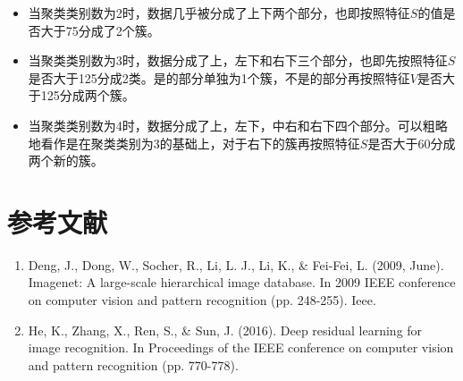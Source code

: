 \documentclass[UTF8]{ctexart}
\begin{document}
	\begin{itemize}
		\item 当聚类类别数为2时，数据几乎被分成了上下两个部分，也即按照特征$S$的值是否大于75分成了2个簇。
		\item 当聚类类别数为3时，数据分成了上，左下和右下三个部分，也即先按照特征$S$是否大于125分成2类。是的部分单独为1个簇，不是的部分再按照特征$V$是否大于125分成两个簇。
		\item 当聚类类别数为4时，数据分成了上，左下，中右和右下四个部分。可以粗略地看作是在聚类类别为3的基础上，对于右下的簇再按照特征$S$是否大于60分成两个新的簇。
	\end{itemize} 
	
	
	\newpage \section{参考文献} 
	
	
	\begin{enumerate}
		\item Deng, J., Dong, W., Socher, R., Li, L. J., Li, K., \& Fei-Fei, L. (2009, June). Imagenet: A large-scale hierarchical image database. In 2009 IEEE conference on computer vision and pattern recognition (pp. 248-255). Ieee. \label{ref1}
		\item He, K., Zhang, X., Ren, S., \& Sun, J. (2016). Deep residual learning for image recognition. In Proceedings of the IEEE conference on computer vision and pattern recognition (pp. 770-778). \label{ref2}
	\end{enumerate}

	
\end{document}
